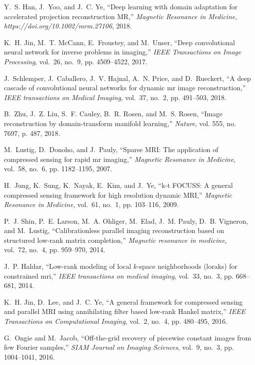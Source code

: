 \documentclass[10pt,journal]{IEEEtran}
\newcommand{\0}{{\boldsymbol{0}}}
\begin{document}
\begin{thebibliography}{10}
Y.~S. Han, J.~Yoo, and J.~C. Ye, ``Deep learning with domain adaptation for
  accelerated projection reconstruction {MR},'' \emph{Magnetic Resonance in
  Medicine, https://doi.org/10.1002/mrm.27106}, 2018.

K.~H. Jin, M.~T. McCann, E.~Froustey, and M.~Unser, ``Deep convolutional neural
  network for inverse problems in imaging,'' \emph{IEEE Transactions on Image
  Processing}, vol.~26, no.~9, pp. 4509--4522, 2017.

J.~Schlemper, J.~Caballero, J.~V. Hajnal, A.~N. Price, and D.~Rueckert, ``A
  deep cascade of convolutional neural networks for dynamic mr image
  reconstruction,'' \emph{IEEE transactions on Medical Imaging}, vol.~37,
  no.~2, pp. 491--503, 2018.

B.~Zhu, J.~Z. Liu, S.~F. Cauley, B.~R. Rosen, and M.~S. Rosen, ``Image
  reconstruction by domain-transform manifold learning,'' \emph{Nature}, vol.
  555, no. 7697, p. 487, 2018.

M.~Lustig, D.~Donoho, and J.~Pauly, ``Sparse {MRI}: The application of
  compressed sensing for rapid mr imaging,'' \emph{Magnetic Resonance in
  Medicine}, vol.~58, no.~6, pp. 1182--1195, 2007.

H.~Jung, K.~Sung, K.~Nayak, E.~Kim, and J.~Ye, ``k-t {FOCUSS}: A general
  compressed sensing framework for high resolution dynamic {MRI},''
  \emph{Magnetic Resonance in Medicine}, vol.~61, no.~1, pp. 103--116, 2009.

P.~J. Shin, P.~E. Larson, M.~A. Ohliger, M.~Elad, J.~M. Pauly, D.~B. Vigneron,
  and M.~Lustig, ``Calibrationless parallel imaging reconstruction based on
  structured low-rank matrix completion,'' \emph{Magnetic resonance in
  medicine}, vol.~72, no.~4, pp. 959--970, 2014.

J.~P. Haldar, ``Low-rank modeling of local $ k $-space neighborhoods (loraks)
  for constrained mri,'' \emph{IEEE transactions on medical imaging}, vol.~33,
  no.~3, pp. 668--681, 2014.

K.~H. Jin, D.~Lee, and J.~C. Ye, ``A general framework for compressed sensing
  and parallel {MRI} using annihilating filter based low-rank {H}ankel
  matrix,'' \emph{IEEE Transactions on Computational Imaging}, vol.~2, no.~4,
  pp. 480--495, 2016.

G.~Ongie and M.~Jacob, ``Off-the-grid recovery of piecewise constant images
  from few {F}ourier samples,'' \emph{SIAM Journal on Imaging Sciences},
  vol.~9, no.~3, pp. 1004--1041, 2016.


\end{thebibliography}
\end{document}

